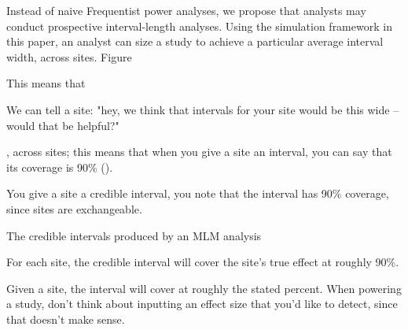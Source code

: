 \documentclass[]{article}
\begin{document}
Instead of naive Frequentist power analyses, we propose that analysts may conduct prospective interval-length analyses.
Using the simulation framework in this paper, an analyst can size a study to achieve a particular average interval width, across sites.
Figure 




This means that 

We can tell a site: "hey, we think that intervals for your site would be this wide -- would that be helpful?"


, across sites; this means that when you give a site an interval, you can say that its coverage is 90\% ().


You give a site a credible interval,
you note that the interval has 90\% coverage, since sites are exchangeable.

The credible intervals produced by an MLM analysis 

For each site, the credible interval will cover the site's true effect at roughly 90\%.

Given a site, the interval will cover at roughly the stated percent.
When powering a study, don't think about inputting an effect size that you'd like to detect, since that doesn't make sense.



\end{document}
